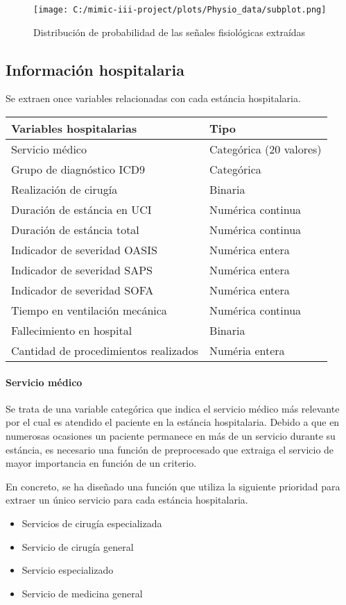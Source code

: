 \documentclass{report}
\begin{document}
\begin{figure}[h]

\texttt{[image: C:/mimic-iii-project/plots/Physio\_data/subplot.png]}
\caption{Distribución de probabilidad de las señales fisiológicas extraídas}
\end{figure}

\subsection{Información hospitalaria}

Se extraen once variables relacionadas con cada estáncia hospitalaria.

\begin{longtable}[]{@{}ll@{}}
\toprule
Variables hospitalarias & Tipo\tabularnewline
\midrule
\endhead
Servicio médico & Categórica (20 valores)\tabularnewline
Grupo de diagnóstico ICD9 & Categórica\tabularnewline
Realización de cirugía & Binaria\tabularnewline
Duración de estáncia en UCI & Numérica continua\tabularnewline
Duración de estáncia total & Numérica continua\tabularnewline
Indicador de severidad OASIS & Numérica entera\tabularnewline
Indicador de severidad SAPS & Numérica entera\tabularnewline
Indicador de severidad SOFA & Numérica entera\tabularnewline
Tiempo en ventilación mecánica & Numérica continua\tabularnewline
Fallecimiento en hospital & Binaria\tabularnewline
Cantidad de procedimientos realizados & Numéria entera\tabularnewline
\bottomrule
\end{longtable}
\paragraph{Servicio médico}
Se trata de una variable categórica que indica el servicio médico más
relevante por el cual es atendido el paciente en la estáncia
hospitalaria. Debido a que en numerosas ocasiones un paciente permanece
en más de un servicio durante su estáncia, es necesario una función de
preprocesado que extraiga el servicio de mayor importancia en función de
un criterio.

En concreto, se ha diseñado una función que utiliza la siguiente
prioridad para extraer un único servicio para cada estáncia
hospitalaria.

\begin{itemize}
\item
  Servicios de cirugía especializada 
\item
  Servicio de cirugía general
\item
  Servicio especializado
\item
  Servicio de medicina general
\end{itemize}
\end{document}
